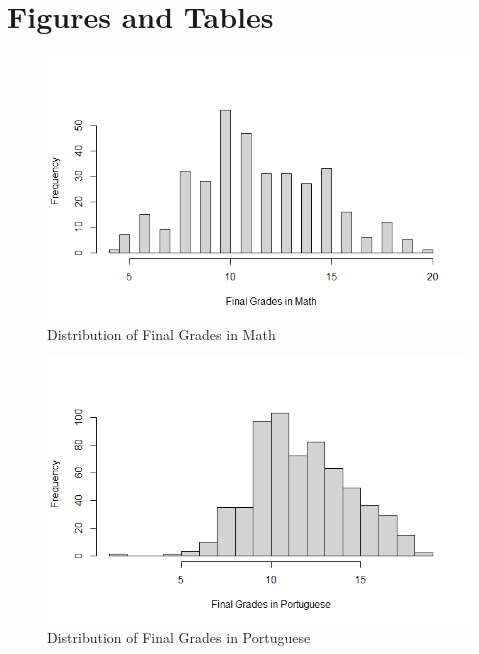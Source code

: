 \documentclass[12pt,english]{article}
\begin{document}
\section{Figures and Tables}
\begin{figure}[ht]
\centering
\bigskip{}
\includegraphics[width=.95\linewidth]{hist_mathgrades.png}
\caption{Distribution of Final Grades in Math}
\label{fig:fig1}
\end{figure}
\begin{figure}[ht]
\centering
\bigskip{}
\includegraphics[width=.95\linewidth]{hist_portgrades.png}
\caption{Distribution of Final Grades in Portuguese}
\label{fig:fig2}
\end{figure}
\end{document}
